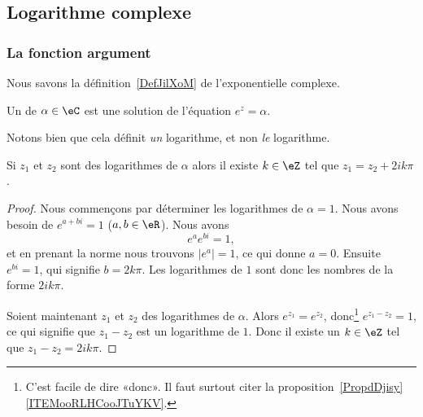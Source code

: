\subsection{Logarithme complexe}


\subsubsection{La fonction argument}

Nous savons la définition~\ref{DefJilXoM} de l'exponentielle complexe.

\begin{definition}
    Un  de \( \alpha\in \eC\) est une solution de l'équation \(  e^{z}=\alpha\).
\end{definition}
Notons bien que cela définit \emph{un} logarithme, et non \emph{le} logarithme.

\begin{lemma}       \label{LEMooUMESooJVzeDb}
    Si \( z_1\) et \( z_2\) sont des logarithmes de \( \alpha\) alors il existe \( k\in \eZ\) tel que \( z_1=z_2+2ik\pi\).
\end{lemma}

\begin{proof}
    Nous commençons par déterminer les logarithmes de \( \alpha=1\). Nous avons besoin de \(  e^{a+bi}=1\) (\( a,b\in \eR\)). Nous avons
    \begin{equation}
        e^{a} e^{bi}=1,
    \end{equation}
    et en prenant la norme nous trouvons \( | e^a |=1\), ce qui donne \( a=0\). Ensuite \(  e^{bi}=1\), qui signifie \( b=2k\pi\). Les logarithmes de \( 1\) sont donc les nombres de la forme \( 2ik\pi\).

    Soient maintenant \( z_1\) et \( z_2\) des logarithmes de \( \alpha\). Alors \(  e^{z_1}= e^{z_2}\), donc\footnote{C'est facile de dire «donc». Il faut surtout citer la proposition~\ref{PropdDjisy}\ref{ITEMooRLHCooJTuYKV}.} \(  e^{z_1-z_2}=1\), ce qui signifie que \( z_1-z_2\) est un logarithme de \( 1\). Donc il existe un \( k\in \eZ\) tel que \( z_1-z_2=2ik\pi\).
\end{proof}

